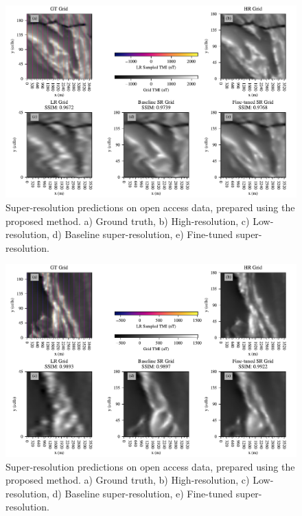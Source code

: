 \begin{landscape}
    \begin{figure}[hbtp]
        \centering
        \includegraphics[width=1\linewidth]{fig/p2/srcomp_23.pdf}
        \caption[Super-resolution geophysics grid results I]{Super-resolution predictions on open access data, prepared using the proposed method.
            a) Ground truth, b) High-resolution, c) Low-resolution, d) Baseline super-resolution, e) Fine-tuned super-resolution.
        }
        \label{fig:srdata23}
    \end{figure}
\end{landscape}

\begin{landscape}
    \begin{figure}[hbtp]
        \centering
        \includegraphics[width=1\linewidth]{fig/p2/srcomp_17.pdf}
        \caption[Super-resolution geophysics grid results II]{Super-resolution predictions on open access data, prepared using the proposed method.
            a) Ground truth, b) High-resolution, c) Low-resolution, d) Baseline super-resolution, e) Fine-tuned super-resolution.
        }
        \label{fig:srdata17}
    \end{figure}
\end{landscape}

